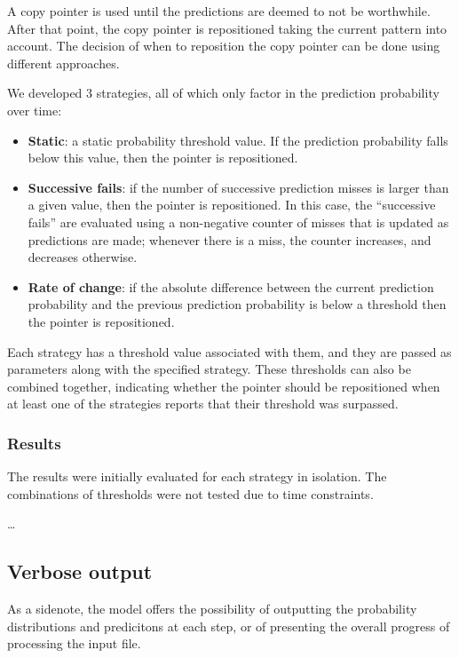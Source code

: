 \documentclass{article}
\begin{document}
A copy pointer is used until the predictions are deemed to not be worthwhile.
After that point, the copy pointer is repositioned taking the current pattern into account.
The decision of when to reposition the copy pointer can be done using different approaches.

We developed 3 strategies, all of which only factor in the prediction probability over time:
\begin{itemize}
    \item \textbf{Static}: a static probability threshold value. If the prediction probability falls below this value, then the pointer is repositioned.
    \item \textbf{Successive fails}: if the number of successive prediction misses is larger than a given value, then the pointer is repositioned.
    In this case, the ``successive fails'' are evaluated using a non-negative counter of misses that is updated as predictions are made; whenever there is a miss, the counter increases, and decreases otherwise.
    \item \textbf{Rate of change}: if the absolute difference between the current prediction probability and the previous prediction probability is below a threshold then the pointer is repositioned.
\end{itemize}

Each strategy has a threshold value associated with them, and they are passed as parameters along with the specified strategy.
These thresholds can also be combined together, indicating whether the pointer should be repositioned when at least one of the strategies reports that their threshold was surpassed.

\subsubsection{Results}

The results were initially evaluated for each strategy in isolation.
The combinations of thresholds were not tested due to time constraints.

\dots

\subsection{Verbose output}
\label{sec:copy-model-verbose}

As a sidenote, the model offers the possibility of outputting the probability distributions and predicitons at each step, or of presenting the overall progress of processing the input file.
\end{document}
